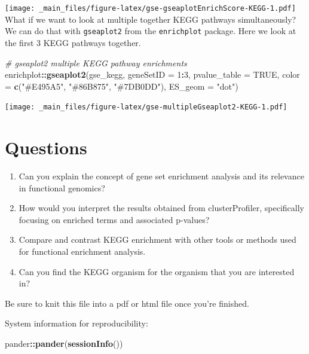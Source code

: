 \documentclass[
]{book}
\newenvironment{Shaded}{\begin{snugshade}}{\end{snugshade}}
\newcommand{\AttributeTok}[1]{\textcolor[rgb]{0.13,0.29,0.53}{#1}}
\newcommand{\CommentTok}[1]{\textcolor[rgb]{0.56,0.35,0.01}{\textit{#1}}}
\newcommand{\ConstantTok}[1]{\textcolor[rgb]{0.56,0.35,0.01}{#1}}
\newcommand{\DecValTok}[1]{\textcolor[rgb]{0.00,0.00,0.81}{#1}}
\newcommand{\FunctionTok}[1]{\textcolor[rgb]{0.13,0.29,0.53}{\textbf{#1}}}
\newcommand{\NormalTok}[1]{#1}
\newcommand{\SpecialCharTok}[1]{\textcolor[rgb]{0.81,0.36,0.00}{\textbf{#1}}}
\newcommand{\StringTok}[1]{\textcolor[rgb]{0.31,0.60,0.02}{#1}}
\begin{document}
\texttt{[image: \_main\_files/figure-latex/gse-gseaplotEnrichScore-KEGG-1.pdf]}
What if we want to look at multiple together KEGG pathways simultaneously? We can do that with \texttt{gseaplot2} from the \texttt{enrichplot} package. Here we look at the first 3 KEGG pathways together.

\begin{Shaded}
\begin{Highlighting}[]
\CommentTok{\# gseaplot2 multiple KEGG pathway enrichments}
\NormalTok{enrichplot}\SpecialCharTok{::}\FunctionTok{gseaplot2}\NormalTok{(gse\_kegg, }\AttributeTok{geneSetID =} \DecValTok{1}\SpecialCharTok{:}\DecValTok{3}\NormalTok{, }\AttributeTok{pvalue\_table =} \ConstantTok{TRUE}\NormalTok{,}
          \AttributeTok{color =} \FunctionTok{c}\NormalTok{(}\StringTok{"\#E495A5"}\NormalTok{, }\StringTok{"\#86B875"}\NormalTok{, }\StringTok{"\#7DB0DD"}\NormalTok{), }\AttributeTok{ES\_geom =} \StringTok{"dot"}\NormalTok{)}
\end{Highlighting}
\end{Shaded}

\texttt{[image: \_main\_files/figure-latex/gse-multipleGseaplot2-KEGG-1.pdf]}

\hypertarget{questions-7}{%
\section{Questions}\label{questions-7}}

\begin{enumerate}
\def\labelenumi{\arabic{enumi}.}
\item
  Can you explain the concept of gene set enrichment analysis and its relevance in functional genomics?
\item
  How would you interpret the results obtained from clusterProfiler, specifically focusing on enriched terms and associated p-values?
\item
  Compare and contrast KEGG enrichment with other tools or methods used for functional enrichment analysis.
\item
  Can you find the KEGG organism for the organism that you are interested in?
\end{enumerate}

Be sure to knit this file into a pdf or html file once you're finished.

System information for reproducibility:

\begin{Shaded}
\begin{Highlighting}[]
\NormalTok{pander}\SpecialCharTok{::}\FunctionTok{pander}\NormalTok{(}\FunctionTok{sessionInfo}\NormalTok{())}
\end{Highlighting}
\end{Shaded}
\end{document}
